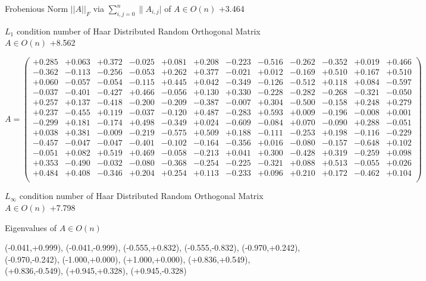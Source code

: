 \documentclass[9pt]{article}
\theoremstyle{plain}
\theoremstyle{definition}
\theoremstyle{remark}
\numberwithin{equation}{section}
\begin{document}
Frobenious Norm  $||A||_{\textit{F}}$ via $\sum\limits_{i,j =0}^{n} \|A_{i,j}|$   of  $A \in O(n)$  +3.464

$L_1$ condition number of Haar Distributed Random Orthogonal Matrix $A \in O(n)$ +8.562

$A = \left(
\begin{array}{
cccccccccccc}
+0.285 & +0.063 & +0.372 & -0.025 & +0.081 & +0.208 & -0.223 & -0.516 & -0.262 & -0.352 & +0.019 & +0.466 \\
-0.362 & -0.113 & -0.256 & -0.053 & +0.262 & +0.377 & -0.021 & +0.012 & -0.169 & +0.510 & +0.167 & +0.510 \\
+0.060 & -0.057 & -0.054 & -0.115 & +0.445 & +0.042 & -0.349 & -0.126 & -0.512 & +0.118 & +0.084 & -0.597 \\
-0.037 & -0.401 & -0.427 & +0.466 & -0.056 & +0.130 & +0.330 & -0.228 & -0.282 & -0.268 & -0.321 & -0.050 \\
+0.257 & +0.137 & -0.418 & -0.200 & -0.209 & -0.387 & -0.007 & +0.304 & -0.500 & -0.158 & +0.248 & +0.279 \\
+0.237 & -0.455 & +0.119 & -0.037 & -0.120 & +0.487 & -0.283 & +0.593 & +0.009 & -0.196 & -0.008 & +0.001 \\
-0.299 & +0.181 & -0.174 & +0.498 & -0.349 & +0.024 & -0.609 & -0.084 & +0.070 & -0.090 & +0.288 & -0.051 \\
+0.038 & +0.381 & -0.009 & -0.219 & -0.575 & +0.509 & +0.188 & -0.111 & -0.253 & +0.198 & -0.116 & -0.229 \\
-0.457 & -0.047 & -0.047 & -0.401 & -0.102 & -0.164 & -0.356 & +0.016 & -0.080 & -0.157 & -0.648 & +0.102 \\
-0.051 & +0.082 & +0.519 & +0.469 & -0.058 & -0.213 & +0.041 & +0.300 & -0.428 & +0.319 & -0.259 & +0.098 \\
+0.353 & -0.490 & -0.032 & -0.080 & -0.368 & -0.254 & -0.225 & -0.321 & +0.088 & +0.513 & -0.055 & +0.026 \\
+0.484 & +0.408 & -0.346 & +0.204 & +0.254 & +0.113 & -0.233 & +0.096 & +0.210 & +0.172 & -0.462 & +0.104 \\
\end{array}
\right)$ \newline 

$L_{\infty}$ condition number of Haar Distributed Random Orthogonal Matrix $A \in O(n)$ +7.798

Eigenvalues of $A \in O(n)$

(-0.041,+0.999), (-0.041,-0.999), (-0.555,+0.832), (-0.555,-0.832), (-0.970,+0.242), (-0.970,-0.242), (-1.000,+0.000), (+1.000,+0.000), (+0.836,+0.549), (+0.836,-0.549), (+0.945,+0.328), (+0.945,-0.328)
\end{document}
